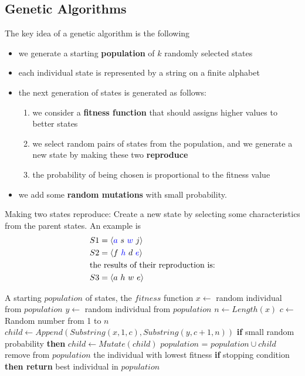 \documentclass[10pt, letterpaper]{report}
\begin{document}
\subsection{Genetic Algorithms}
The key idea of a \textlatin{genetic algorithm} is the following\begin{itemize}
    \item we generate a starting \textbf{population} of $k$ randomly selected states 
    \item each individual state is represented by a string on a finite alphabet
    \item the next generation of states is generated as follows:\begin{enumerate}
        \item we consider a \textbf{fitness function} that should assigns higher values to better states 
        \item we select random pairs of states from the population, and we generate a new state by making these two \textbf{reproduce}
        \item the probability of being chosen is proportional to the fitness value 
    \end{enumerate}
    \item we add some \textbf{random mutations} with small probability.
\end{itemize}
Making two states reproduce: Create a new state by selecting some characteristics from the parent states. An example is\begin{align*}
    &S1 = \langle \color{blue}a\color{black} \ s \ \color{blue}w\color{black} \ j\rangle\\
    &S2 = \langle f \ \color{blue}h\color{black} \ d \ \color{blue}e\color{black}\rangle\\ 
    &\text{the results of their reproduction is:}\\ 
    &S3 = \langle a \ h \ w \ e\rangle\\
\end{align*}

\begin{algorithm}
    \caption{ GENETIC-ALGORITHM}\label{alg:GenAlg}
    \begin{algorithmic}
    \Require A starting $population$ of states, the $fitness$ function 
    \State $x\leftarrow $ random individual from $population$
    \State $y\leftarrow $ random individual from $population$
    \State{}
    \State $n\leftarrow Length(x)$
    \State $c\leftarrow $Random number from 1 to $n$
    \State $child\leftarrow Append(Substring(x,1,c),Substring(y,c+1,n))$
    \State\textbf{if} small random probability \textbf{then} $child\leftarrow Mutate(child)$
    \State $population$ = $population\cup child$
    \State remove from $population$ the individual with lowest fitness
    \EndFor 
    \State\textbf{if} stopping condition \textbf{then return} best individual in $population$
    \EndWhile
    \end{algorithmic}
\end{algorithm}
\end{document}
